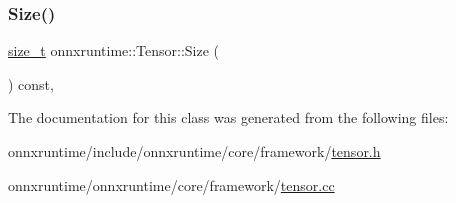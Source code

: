 \subsubsection{\texorpdfstring{Size()}{Size()}}
{\footnotesize\ttfamily \mbox{\hyperlink{mlasi_8h_a503efbc1c6e50825320ad909366b78ab}{size\+\_\+t}} onnxruntime\+::\+Tensor\+::\+Size (\begin{DoxyParamCaption}{ }\end{DoxyParamCaption}) const\hspace{0.3cm}{\ttfamily [inline]}, {\ttfamily [noexcept]}}



The documentation for this class was generated from the following files\+:\begin{DoxyCompactItemize}
\item 
onnxruntime/include/onnxruntime/core/framework/\mbox{\hyperlink{tensor_8h}{tensor.\+h}}\item 
onnxruntime/onnxruntime/core/framework/\mbox{\hyperlink{tensor_8cc}{tensor.\+cc}}\end{DoxyCompactItemize}
